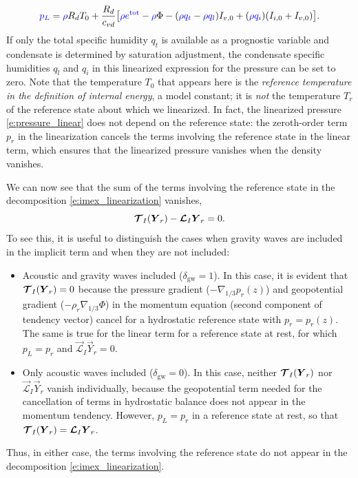 \documentclass{report}
\begin{document}
\begin{equation}\label{e:pressure_linear}
\textcolor{blue}{p_L} = \textcolor{blue}{\rho} R_d T_0 + \frac{R_d}{c_{vd}} \bigl[ \textcolor{blue}{\rho e^{\mathrm{tot}}} - \textcolor{blue}{\rho} \Phi - (\textcolor{blue}{\rho q_t} - \textcolor{blue}{\rho q_l})I_{v,0} + (\textcolor{blue}{\rho q_i}) (I_{i,0} + I_{v,0}) \bigr].
\end{equation}
If only the total specific humidity $q_t$ is available as a prognostic variable and condensate is determined by saturation adjustment, the condensate specific humidities $q_l$ and $q_i$ in this linearized expression for the pressure can be set to zero. Note that the temperature $T_0$ that appears here is the \emph{reference temperature in the definition of internal energy}, a model constant; it is \emph{not} the temperature $T_r$ of the reference state about which we linearized. In fact, the linearized pressure \eqref{e:pressure_linear} does not depend on the reference state: the zeroth-order term $p_r$ in the linearization cancels the terms involving the reference state in the linear term, which ensures that the linearized pressure vanishes when the density vanishes. 

We can now see that the sum of the terms involving the reference state in the decomposition \eqref{e:imex_linearization} vanishes,
\[
\boldsymbol{{\mathcal{T}}}_I(\boldsymbol{{Y}}_r) - \boldsymbol{{\mathcal{L}}}_I \boldsymbol{{Y}}_r = 0.
\]
To see this, it is useful to distinguish the cases when gravity waves are included in the implicit term and when they are not included: 
\begin{itemize}
    \item Acoustic and gravity waves included ($\delta_{\mathrm{gw}}=1$). In this case, it is evident that $\boldsymbol{{\mathcal{T}}}_I(\boldsymbol{{Y}}_r)=0$ because the pressure gradient ($-\nabla_{1/3} p_r(z)$) and geopotential gradient ($-\rho_r\nabla_{1/3}\Phi$) in the momentum equation (second component of tendency vector) cancel for a hydrostatic reference state with $p_r = p_r(z)$. The same is true for the linear term for a reference state at rest, for which $p_L = p_r$ and $\vec{\mathcal{L}}_I \vec{Y}_r = 0$. 
    \item Only acoustic waves included ($\delta_{\mathrm{gw}}=0$). In this case, neither $\boldsymbol{{\mathcal{T}}}_I(\boldsymbol{{Y}}_r)$ nor $\vec{\mathcal{L}}_I\vec{Y}_r$ vanish individually, because the geopotential term needed for the cancellation of terms in hydrostatic balance does not appear in the momentum tendency. However, $p_L = p_r$ in a reference state at rest, so that $\boldsymbol{{\mathcal{T}}}_I(\boldsymbol{{Y}}_r) = \boldsymbol{{\mathcal{L}}}_I\boldsymbol{{Y}}_r$.
\end{itemize}
Thus, in either case, the terms involving the reference state do not appear  in the decomposition \eqref{e:imex_linearization}. 
\end{document}
